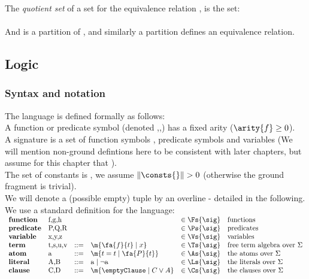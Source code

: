 The \emph{quotient set} of a set  for the equivalence relation \m{\approx},  is the set:\\
\\
And is a partition of , and similarly a partition defines an equivalence relation.



\subsection{Logic}

\subsubsection{Syntax and notation}

The language is defined formally as follows:\\
A function or predicate symbol (denoted ,,) has a fixed arity ($\arity{f}\geq 0$).\\
A signature \m{\Sigma=\Fs{\Sigma} \cup \Ps{\Sigma} \cup \Vs{\Sigma}}
is a set of function symbols \Fs{\sig}, predicate symbols \Ps{\sig} and variables \Vs{\sig}
(We will mention non-ground defintions here to be consistent with later chapters, but assume for this chapter that \m{\Ps{\sig}=\Vs{\sig}==\emptyset}).\\
The set of constants is , we assume $\|\consts{}\|>0$ (otherwise the ground fragment is trivial).\\
We will denote a (possible empty) tuple by an overline - detailed in the following.\\
We use a standard definition for the language:\\
$
\begin{array}{llllll}
	\mathbf{function}  & \mbox{f,g,h}   &     &                                & \in \Fs{\sig} & \textrm{functions}\\
	\mathbf{predicate} & \mbox{P,Q,R}   &     &                                & \in \Ps{\sig} & \textrm{predicates}\\
	\mathbf{variable}  & \mbox{x,y,z}   &     &                                & \in \Vs{\sig} & \textrm{variables}\\
	\mathbf{term}      & \mbox{t,s,u,v} & ::= & \m{\fa{f}{t} \mid x}           & \in \Ts{\sig} & \textrm{free term algebra over } \Sigma\\
	\mathbf{atom}      & \mbox{a}       & ::= & \m{t = t \mid \fa{P}{t}}       & \in \As{\sig} & \textrm{the atoms over } \Sigma\\
	\mathbf{literal}   & \mbox{A,B}     & ::= & \mbox{a} \mid \lnot \mbox{a}   & \in \Ls{\sig} & \textrm{the literals over } \Sigma\\
	\mathbf{clause}    & \mbox{C,D}     & ::= & \m{\emptyClause \mid C \lor A} & \in \Cs{\sig} & \textrm{the clauses over } \Sigma\\
\end{array}
$

